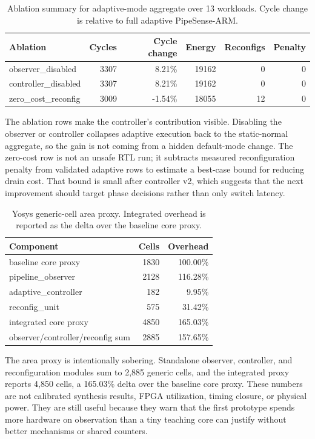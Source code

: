 \documentclass[conference]{IEEEtran}
\newcommand{\pipesense}{PipeSense-ARM}
\begin{document}
\begin{table}[t]
\centering
\caption{Ablation summary for adaptive-mode aggregate over 13 workloads. Cycle change is relative to full adaptive \pipesense{}.}
\label{tab:ablation}
\small
\begin{tabular}{lrrrrr}
\hline
Ablation & Cycles & Cycle change & Energy & Reconfigs & Penalty \\
\hline
observer\_disabled & 3307 & 8.21\% & 19162 & 0 & 0 \\
controller\_disabled & 3307 & 8.21\% & 19162 & 0 & 0 \\
zero\_cost\_reconfig & 3009 & -1.54\% & 18055 & 12 & 0 \\
\hline
\end{tabular}
\end{table}

The ablation rows make the controller's contribution visible. Disabling the observer or controller collapses adaptive execution back to the static-normal aggregate, so the gain is not coming from a hidden default-mode change. The zero-cost row is not an unsafe RTL run; it subtracts measured reconfiguration penalty from validated adaptive rows to estimate a best-case bound for reducing drain cost. That bound is small after controller v2, which suggests that the next improvement should target phase decisions rather than only switch latency.

\begin{table}[t]
\centering
\caption{Yosys generic-cell area proxy. Integrated overhead is reported as the delta over the baseline core proxy.}
\label{tab:cost}
\small
\begin{tabular}{lrr}
\hline
Component & Cells & Overhead \\
\hline
baseline core proxy & 1830 & 100.00\% \\
pipeline\_observer & 2128 & 116.28\% \\
adaptive\_controller & 182 & 9.95\% \\
reconfig\_unit & 575 & 31.42\% \\
integrated core proxy & 4850 & 165.03\% \\
observer/controller/reconfig sum & 2885 & 157.65\% \\
\hline
\end{tabular}
\end{table}

The area proxy is intentionally sobering. Standalone observer, controller, and reconfiguration modules sum to 2,885 generic cells, and the integrated proxy reports 4,850 cells, a 165.03\% delta over the baseline core proxy. These numbers are not calibrated synthesis results, FPGA utilization, timing closure, or physical power. They are still useful because they warn that the first prototype spends more hardware on observation than a tiny teaching core can justify without better mechanisms or shared counters.
\end{document}
